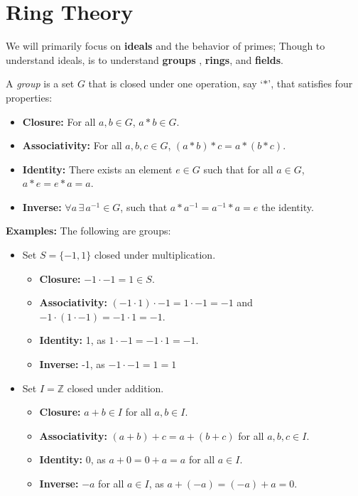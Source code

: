 \section{Ring Theory}
We will primarily focus on \textbf{ideals} and the behavior of primes; Though
to understand ideals, is to understand \textbf{groups }, \textbf{rings}, and \textbf{fields}.

\begin{Def}[Group]

    A \textit{group} is a set $G$ that is closed under one operation, say `$*$', that satisfies four properties:
    \begin{itemize}
        \item \textbf{Closure:} For all $a,b\in G$, $a*b\in G$.
        \item \textbf{Associativity:} For all $a,b,c\in G$, $(a*b)*c=a*(b*c)$.
        \item \textbf{Identity:} There exists an element $e\in G$ such that for all $a\in G$, $a*e=e*a=a$.
        \item \textbf{Inverse:} $\forall a\,\exists\, a^{-1}\in G$, such that $a*a^{-1}=a^{-1}*a=e$ the identity.
    \end{itemize}
\end{Def}
\newpage

\noindent
\textbf{Examples:} The following are groups:
\begin{itemize}
    \item Set $S=\{-1,1\}$ closed under multiplication.
          \begin{itemize}
              \item \textbf{Closure:} $-1\cdot-1=1\in S$.
              \item \textbf{Associativity:} $(-1\cdot1)\cdot-1=1\cdot-1=-1$ and $-1\cdot(1\cdot-1)=-1\cdot1=-1$.
              \item \textbf{Identity:} 1, as $1 \cdot -1=-1\cdot1=-1$.
              \item \textbf{Inverse:} -1, as $-1\cdot-1=1=1$
          \end{itemize}

    \item Set $I=\mathbb{Z}$ closed under addition.
          \begin{itemize}
              \item \textbf{Closure:} $a+b\in I$ for all $a,b\in I$.
              \item \textbf{Associativity:} $(a+b)+c=a+(b+c)$ for all $a,b,c\in I$.
              \item \textbf{Identity:} 0, as $a+0=0+a=a$ for all $a\in I$.
              \item \textbf{Inverse:} $-a$ for all $a\in I$, as $a+(-a)=(-a)+a=0$.
          \end{itemize}
\end{itemize}

